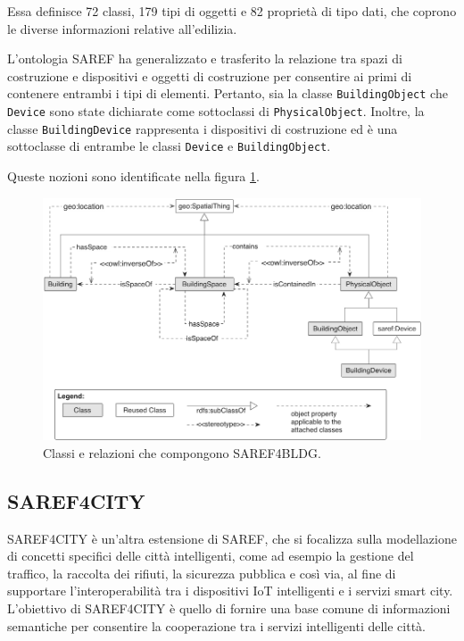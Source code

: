 Essa definisce 72 classi, 179 tipi di oggetti e 82 proprietà di tipo dati, che
coprono le diverse informazioni relative all'edilizia.

L'ontologia SAREF ha generalizzato e trasferito la relazione tra spazi di
costruzione e dispositivi e oggetti di costruzione per consentire ai primi di
contenere entrambi i tipi di elementi. Pertanto, sia la classe
\texttt{BuildingObject} che \texttt{Device} sono state dichiarate come
sottoclassi
di \texttt{PhysicalObject}. Inoltre, la classe \texttt{BuildingDevice}
rappresenta
i dispositivi di costruzione ed è una sottoclasse di entrambe le classi
\texttt{Device} e \texttt{BuildingObject}.

Queste nozioni sono identificate nella figura \ref{fig:saref4bldg}.
\begin{figure}[!ht]
      \centering
      \includegraphics[width=13cm]{figures/saref4bldg.png}
      \caption{Classi e relazioni che compongono SAREF4BLDG.}
      \label{fig:saref4bldg}
\end{figure}

\subsection{SAREF4CITY}
SAREF4CITY \cite{saref4city} è un'altra estensione di SAREF, che si focalizza
sulla modellazione
di concetti specifici delle città intelligenti, come ad esempio la gestione del
traffico, la raccolta dei rifiuti, la sicurezza pubblica e così via, al fine di
supportare l'interoperabilità tra i dispositivi IoT intelligenti e i servizi
smart city. L'obiettivo di SAREF4CITY è quello di fornire una base comune di
informazioni semantiche per consentire la cooperazione tra i servizi
intelligenti delle città.

